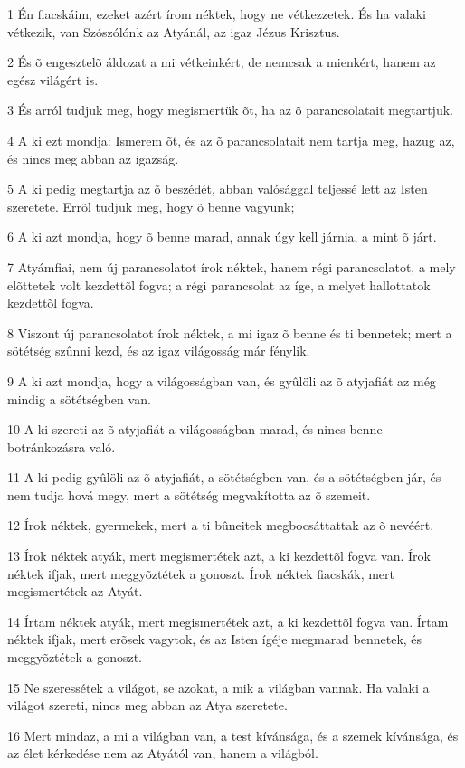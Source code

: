 \par 1 Én fiacskáim, ezeket azért írom néktek, hogy ne vétkezzetek. És ha valaki vétkezik, van Szószólónk az Atyánál, az igaz Jézus Krisztus.
\par 2 És õ engesztelõ áldozat a mi vétkeinkért; de nemcsak a mienkért, hanem az egész  világért is.
\par 3 És arról tudjuk meg, hogy megismertük õt, ha az õ parancsolatait megtartjuk.
\par 4 A ki ezt mondja: Ismerem õt, és az õ parancsolatait nem tartja meg, hazug az, és nincs meg abban az igazság.
\par 5 A ki pedig megtartja az õ beszédét, abban valósággal teljessé lett az Isten szeretete. Errõl tudjuk meg, hogy õ benne vagyunk;
\par 6 A ki azt mondja, hogy õ benne marad, annak úgy kell járnia,  a mint õ járt.
\par 7 Atyámfiai, nem új parancsolatot írok néktek, hanem régi parancsolatot, a mely elõttetek volt kezdettõl fogva;  a régi parancsolat az íge, a melyet hallottatok kezdettõl fogva.
\par 8 Viszont új parancsolatot írok néktek, a mi igaz õ benne és ti bennetek; mert a sötétség  szûnni kezd, és az igaz világosság már fénylik.
\par 9 A ki azt mondja, hogy a világosságban van, és gyûlöli az õ atyjafiát az még mindig a sötétségben van.
\par 10 A ki szereti az õ atyjafiát a világosságban marad, és nincs benne botránkozásra  való.
\par 11 A ki pedig gyûlöli az õ atyjafiát, a sötétségben van, és a sötétségben jár, és nem tudja hová  megy, mert a sötétség megvakította az õ szemeit.
\par 12 Írok néktek, gyermekek, mert a ti bûneitek megbocsáttattak az õ nevéért.
\par 13 Írok néktek atyák, mert megismertétek azt, a ki kezdettõl fogva van. Írok néktek ifjak, mert meggyõztétek a gonoszt. Írok néktek fiacskák, mert megismertétek az Atyát.
\par 14 Írtam néktek atyák, mert megismertétek azt, a ki kezdettõl fogva van. Írtam néktek ifjak, mert erõsek vagytok, és az Isten ígéje megmarad bennetek, és meggyõztétek a gonoszt.
\par 15 Ne szeressétek a világot, se azokat, a mik a világban vannak. Ha valaki a világot szereti, nincs meg abban az Atya szeretete.
\par 16 Mert mindaz, a mi a világban van, a test kívánsága, és a szemek kívánsága, és az élet kérkedése nem az Atyától van, hanem a világból.
